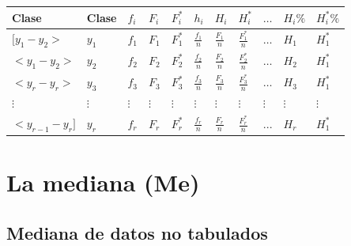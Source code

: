 \documentclass[
  10pt,
]{krantz}
\theoremstyle{definition}
\theoremstyle{definition}
\theoremstyle{definition}
\theoremstyle{definition}
\theoremstyle{remark}
\begin{document}
\begin{longtable}[]{@{}
  >{\centering\arraybackslash}p{}
  >{\centering\arraybackslash}p{}
  >{\centering\arraybackslash}p{}
  >{\centering\arraybackslash}p{}
  >{\centering\arraybackslash}p{}
  >{\centering\arraybackslash}p{}
  >{\centering\arraybackslash}p{}
  >{\centering\arraybackslash}p{}
  >{\centering\arraybackslash}p{}
  >{\raggedright\arraybackslash}p{}
  >{\raggedright\arraybackslash}p{}@{}}
\toprule
Clase & Clase & \(f_i\) & \(F_i\) & \(F_i^*\) & \(h_i\) & \(H_i\) & \(H_i^*\) & \(\ldots\) & \(H_i\%\) & \(H_i^*\%\) \\
\midrule
\endhead
\([y_1-y_2>\) & \(y_1\) & \(f_1\) & \(F_1\) & \(F_1^*\) & \(\frac{f_1}{n}\) & \(\frac{F_1}{n}\) & \(\frac{F_1^*}{n}\) & \(\ldots\) & \(H_1\) & \(H_1^*\) \\
\(<y_1-y_2>\) & \(y_2\) & \(f_2\) & \(F_2\) & \(F_2^*\) & \(\frac{f_2}{n}\) & \(\frac{F_2}{n}\) & \(\frac{F_2^*}{n}\) & \(\ldots\) & \(H_2\) & \(H_1^*\) \\
\(<y_{r}-y_r>\) & \(y_3\) & \(f_3\) & \(F_3\) & \(F_3^*\) & \(\frac{f_3}{n}\) & \(\frac{F_3}{n}\) & \(\frac{F_3^*}{n}\) & \(\ldots\) & \(H_3\) & \(H_1^*\) \\
\(\vdots\) & \(\vdots\) & \(\vdots\) & \(\vdots\) & \(\vdots\) & \(\vdots\) & \(\vdots\) & \(\vdots\) & \(\vdots\) & \(\vdots\) & \(\vdots\) \\
\(<y_{r-1}-y_r]\) & \(y_r\) & \(f_r\) & \(F_r\) & \(F_r^*\) & \(\frac{f_r}{n}\) & \(\frac{F_r}{n}\) & \(\frac{F_r^*}{n}\) & \(...\) & \(H_r\) & \(H_1^*\) \\
\bottomrule
\end{longtable}

\hypertarget{la-mediana-me}{%
\section{La mediana (Me)}\label{la-mediana-me}}

\hypertarget{mediana-de-datos-no-tabulados}{%
\subsection{Mediana de datos no tabulados}\label{mediana-de-datos-no-tabulados}}
\end{document}
